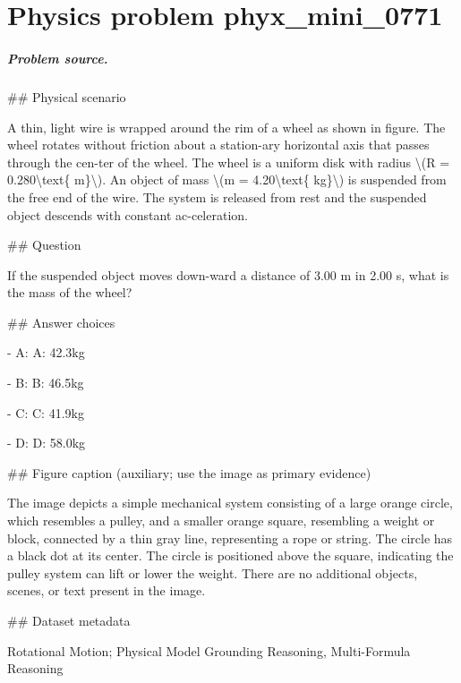 
\chapter{Physics problem phyx\_mini\_0771}
\label{ch:PhyXMiniProblems_problem_phyx_mini_0771}

\paragraph{Problem source.}
\#\# Physical scenario

A thin, light wire is wrapped around the rim of a wheel as shown in figure. The wheel rotates without friction about a station-ary horizontal axis that passes through the cen-ter of the wheel. The wheel is a uniform disk with radius \textbackslash{}(R = 0.280\textbackslash{}text\{ m\}\textbackslash{}). An object of mass \textbackslash{}(m = 4.20\textbackslash{}text\{ kg\}\textbackslash{}) is suspended from the free end of the wire. The system is released from rest and the suspended object descends with constant ac-celeration.

\#\# Question

If the suspended object moves down-ward a distance of 3.00 m in 2.00 s, what is the mass of the wheel?

\#\# Answer choices

- A: A: 42.3kg

- B: B: 46.5kg

- C: C: 41.9kg

- D: D: 58.0kg

\#\# Figure caption (auxiliary; use the image as primary evidence)

The image depicts a simple mechanical system consisting of a large orange circle, which resembles a pulley, and a smaller orange square, resembling a weight or block, connected by a thin gray line, representing a rope or string. The circle has a black dot at its center. The circle is positioned above the square, indicating the pulley system can lift or lower the weight. There are no additional objects, scenes, or text present in the image.

\#\# Dataset metadata

Rotational Motion; Physical Model Grounding Reasoning, Multi-Formula Reasoning

